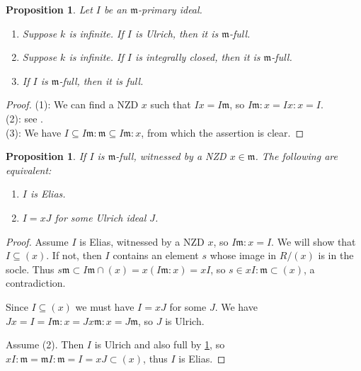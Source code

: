 \documentclass[a4paper,12pt]{amsart}
\newtheorem{prop}[thm]{\bf Proposition}
\theoremstyle{definition}
\theoremstyle{remark}
\numberwithin{equation}{section}
\def\fm{\mathfrak{m}}
\begin{document}
\begin{prop}\label{prop2}
Let $I$ be an $\fm$-primary ideal. 
\begin{enumerate}
\item Suppose $k$ is infinite. If $I$ is Ulrich, then it is $\fm$-full. 
\item Suppose $k$ is infinite. If $I$ is integrally closed, then it is $\fm$-full.  
\item If $I$ is $\fm$-full, then it is full. 
\end{enumerate}

\end{prop}

\begin{proof}
(1): We can find a NZD $x$ such that $Ix=I\fm$, so $I\fm:x = Ix:x=I$. \\
(2): see \cite[Theorem 2.4]{Goto}. \\
(3): We have $I\subseteq I\fm:\fm\subseteq I\fm:x$, from which the assertion is clear. 


\end{proof}


\begin{prop}\label{propmfull}
If $I$ is $\fm$-full, witnessed by a NZD $x\in \fm$. The following are equivalent:
\begin{enumerate}
\item $I$ is Elias. 
\item $I=xJ$ for some  Ulrich ideal $J$. 
\end{enumerate}
\end{prop}

\begin{proof}
Assume $I$ is Elias, witnessed by a NZD $x$, so $I\fm:x=I$. We will show that $I\subseteq (x)$. If not, then $I$ contains an element $s$ whose image in $R/(x)$ is in the socle. Thus $s\fm\subset I\fm\cap(x) = x(I\fm:x)=xI$, so $s\in xI:\fm\subset (x)$, a contradiction. 

Since $I\subseteq (x)$ we must have $I=xJ$ for some $J$. We have $Jx=I= I\fm:x=Jx\fm:x=J\fm$, so $J$ is Ulrich. 

Assume (2). Then $I$ is Ulrich and also full by \ref{prop2}, so  $xI:\fm = \fm I:\fm=I=xJ\subset (x)$, thus $I$ is Elias. 
\end{proof}

\end{document}
